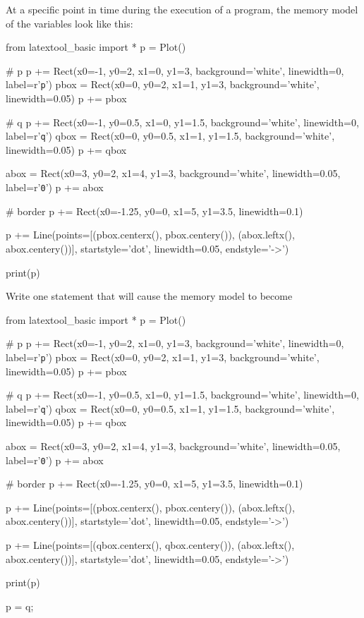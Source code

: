 \nextq
At a specific point in time during the execution of
a program, the memory model of the variables look like this:
\begin{python}
from latextool_basic import *
p = Plot()

# p
p += Rect(x0=-1, y0=2, x1=0, y1=3, background='white', linewidth=0, label=r'\texttt{p}')
pbox = Rect(x0=0, y0=2, x1=1, y1=3, background='white', linewidth=0.05)
p += pbox

# q
p += Rect(x0=-1, y0=0.5, x1=0, y1=1.5, background='white', linewidth=0, label=r'\texttt{q}')
qbox = Rect(x0=0, y0=0.5, x1=1, y1=1.5, background='white', linewidth=0.05)
p += qbox

abox = Rect(x0=3, y0=2, x1=4, y1=3, background='white', linewidth=0.05,
            label=r'\texttt{0}')
p += abox

# border
p += Rect(x0=-1.25, y0=0, x1=5, y1=3.5, linewidth=0.1)

p += Line(points=[(pbox.centerx(), pbox.centery()),
                  (abox.leftx(), abox.centery())],
          startstyle='dot', linewidth=0.05,
          endstyle='->')

print(p)
\end{python}
Write one statement that will cause the memory model to become
\begin{python}
from latextool_basic import *
p = Plot()

# p
p += Rect(x0=-1, y0=2, x1=0, y1=3, background='white', linewidth=0, label=r'\texttt{p}')
pbox = Rect(x0=0, y0=2, x1=1, y1=3, background='white', linewidth=0.05)
p += pbox

# q
p += Rect(x0=-1, y0=0.5, x1=0, y1=1.5, background='white', linewidth=0, label=r'\texttt{q}')
qbox = Rect(x0=0, y0=0.5, x1=1, y1=1.5, background='white', linewidth=0.05)
p += qbox

abox = Rect(x0=3, y0=2, x1=4, y1=3, background='white', linewidth=0.05,
            label=r'\texttt{0}')
p += abox

# border
p += Rect(x0=-1.25, y0=0, x1=5, y1=3.5, linewidth=0.1)

p += Line(points=[(pbox.centerx(), pbox.centery()),
                  (abox.leftx(), abox.centery())],
          startstyle='dot', linewidth=0.05,
          endstyle='->')

p += Line(points=[(qbox.centerx(), qbox.centery()),
                  (abox.leftx(), abox.centery())],
          startstyle='dot', linewidth=0.05,
          endstyle='->')

print(p)
\end{python}
\ANSWER
\begin{answercode}
p = q;
\end{answercode}


